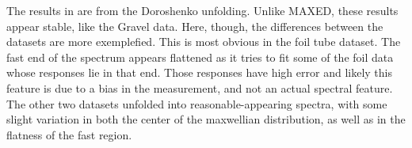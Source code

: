 The results in  are from the Doroshenko unfolding.
Unlike MAXED, these results appear stable, like the Gravel data.
Here, though, the differences between the datasets are more exemplefied.
This is most obvious in the foil tube dataset.
The fast end of the spectrum appears flattened as it tries to fit some of the foil data whose responses lie in that end.
Those responses have high error and likely this feature is due to a bias in the measurement, and not an actual spectral feature.
The other two datasets unfolded into reasonable-appearing spectra, with some slight variation in both the center of the maxwellian distribution, as well as in the flatness of the fast region.

